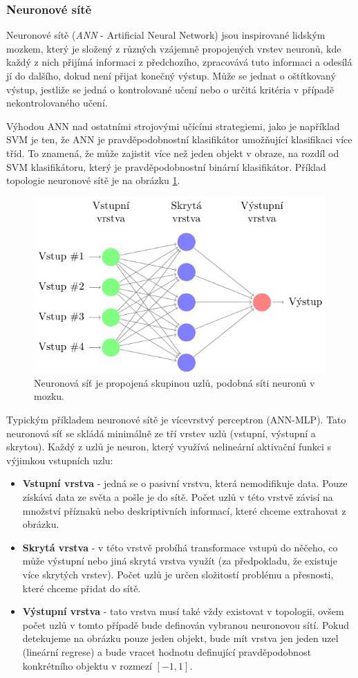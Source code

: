\subsubsection*{Neuronové sítě}
Neuronové sítě (\textit{ANN} - Artificial Neural Network) jsou inspirované lidským mozkem, který je složený z různých vzájemně propojených vrstev neuronů, kde každý z nich přijímá informaci z předchozího, zpracovává tuto informaci a odesílá jí do dalšího, dokud není přijat konečný výstup. Může se jednat o oštítkovaný výstup, jestliže se jedná o kontrolované učení nebo o určitá kritéria v případě nekontrolovaného učení.

Výhodou ANN nad ostatními strojovými učícími strategiemi, jako je například SVM je ten, že ANN je pravděpodobnostní klasifikátor umožňující klasifikaci více tříd. To znamená, že může zajistit více než jeden objekt v obraze, na rozdíl od SVM klasifikátoru, který je pravděpodobnostní binární klasifikátor. Příklad topologie neuronové sítě je na obrázku \ref{fig:ann}. 
\begin{figure}[H]
\centering
\includegraphics[width=.8\linewidth]{figures/ann.pdf}
\caption{Neuronová síť je propojená skupinou uzlů, podobná síti neuronů v mozku.}
\label{fig:ann}
\end{figure}

Typickým příkladem neuronové sítě je vícevrstvý perceptron (ANN-MLP). Tato neuronová síť se skládá minimálně ze tří vrstev uzlů (vstupní, výstupní a skrytou). Každý z uzlů je neuron, který využívá nelineární aktivační funkci s výjimkou vstupních uzlu:
\begin{itemize}
  \item{\textbf{Vstupní vrstva} - jedná se o pasivní vrstvu, která nemodifikuje data. Pouze získává data ze světa a pošle je do sítě. Počet uzlů v této vrstvě závisí na množství příznaků nebo deskriptivních informací, které chceme extrahovat z obrázku.}
  \item{\textbf{Skrytá vrstva} - v této vrstvě probíhá transformace vstupů do něčeho, co může výstupní nebo jiná skrytá vrstva využít (za předpokladu, že existuje více skrytých vrstev). Počet uzlů je určen složitostí problému a přesnosti, které chceme přidat do sítě. }
  \item{\textbf{Výstupní vrstva} - tato vrstva musí také vždy existovat v topologii, ovšem počet uzlů v tomto případě bude definován vybranou neuronovou sítí. Pokud detekujeme na obrázku pouze jeden objekt, bude mít vrstva jen jeden uzel (lineární regrese) a bude vracet hodnotu definující pravděpodobnost konkrétního objektu v rozmezí $[-1,1]$.}
\end{itemize}

